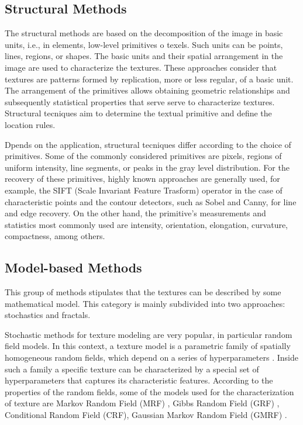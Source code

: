 \subsection{Structural Methods}
The structural methods are based on the decomposition of the image in basic units, i.e., in elements, low-level primitives o texels. Such units can be points, lines, regions, or shapes. The basic units and their spatial arrangement in the image are used to characterize the textures. These approaches consider that textures are patterns formed by replication, more or less regular, of a basic unit. The arrangement of the primitives allows obtaining geometric relationships and subsequently statistical properties that serve serve to characterize textures. Structural tecniques aim to determine the textual primitive and define the location rules.

Dpends on the application, structural tecniques differ according to the choice of primitives. Some of the commonly considered primitives are pixels, regions of uniform intensity, line segments, or peaks in the gray level distribution. For the recovery of these primitives, highly known approaches are generally used, for example, the SIFT (Scale Invariant Feature Trasform) operator in the case of characteristic points and the contour detectors, such as Sobel and Canny, for line and edge recovery. On the other hand, the primitive's measurements and statistics most commonly used are intensity, orientation, elongation, curvature, compactness, among others.

\subsection{Model-based Methods}
This group of methods stipulates that the textures can be described by some mathematical model. This category is mainly subdivided into two approaches: stochastics and fractals.

Stochastic methods for texture modeling are very popular, in particular random field models. In this context, a texture model is a parametric family of spatially homogeneous random fields, which depend on a series of hyperparameters \citep{Winkler:Book:2003}. Inside such a family a specific texture can be characterized by a special set of hyperparameters that captures its characteristic features. According to the properties of the random fields, some of the models used for the characterization of texture are Markov Random Field (MRF) \citep{Hassner.Sklansky:CGIM:1980, Cross.Jain:PAMI:1983}, Gibbs Random Field (GRF) \citep{Derin.Cole:CVGIM:1986}, Conditional Random Field (CRF), Gaussian Markov Random Field (GMRF) \citep{Cohen.Fan.ea:PAMI:1991}.

